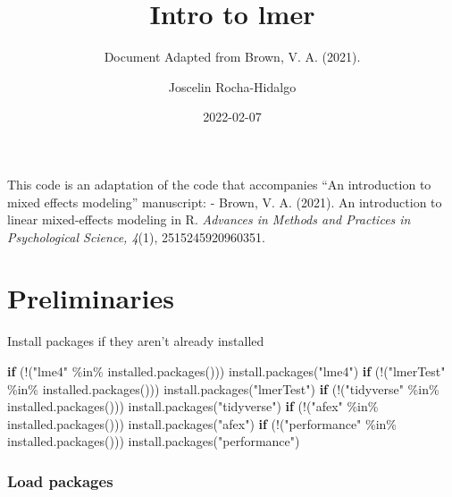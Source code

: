 \documentclass[
]{article}
\title{Intro to lmer}
\subtitle{Document Adapted from Brown, V. A. (2021).}
\author{Joscelin Rocha-Hidalgo}
\date{2022-02-07}
\newenvironment{Shaded}{\begin{snugshade}}{\end{snugshade}}
\newcommand{\ControlFlowTok}[1]{\textcolor[rgb]{0.13,0.29,0.53}{\textbf{#1}}}
\newcommand{\FunctionTok}[1]{\textcolor[rgb]{0.00,0.00,0.00}{#1}}
\newcommand{\NormalTok}[1]{#1}
\newcommand{\SpecialCharTok}[1]{\textcolor[rgb]{0.00,0.00,0.00}{#1}}
\newcommand{\StringTok}[1]{\textcolor[rgb]{0.31,0.60,0.02}{#1}}
\begin{document}
\maketitle

{
\setcounter{tocdepth}{6}
\tableofcontents
}
This code is an adaptation of the code that accompanies ``An
introduction to mixed effects modeling'' manuscript: - Brown, V. A.
(2021). An introduction to linear mixed-effects modeling in R.
\emph{Advances in Methods and Practices in Psychological Science, 4}(1),
2515245920960351.

\hypertarget{preliminaries}{%
\section{Preliminaries}\label{preliminaries}}

Install packages if they aren't already installed

\begin{Shaded}
\begin{Highlighting}[]
\ControlFlowTok{if}\NormalTok{ (}\SpecialCharTok{!}\NormalTok{(}\StringTok{"lme4"} \SpecialCharTok{\%in\%} \FunctionTok{installed.packages}\NormalTok{())) }\FunctionTok{install.packages}\NormalTok{(}\StringTok{"lme4"}\NormalTok{)}
\ControlFlowTok{if}\NormalTok{ (}\SpecialCharTok{!}\NormalTok{(}\StringTok{"lmerTest"} \SpecialCharTok{\%in\%} \FunctionTok{installed.packages}\NormalTok{())) }\FunctionTok{install.packages}\NormalTok{(}\StringTok{"lmerTest"}\NormalTok{)}
\ControlFlowTok{if}\NormalTok{ (}\SpecialCharTok{!}\NormalTok{(}\StringTok{"tidyverse"} \SpecialCharTok{\%in\%} \FunctionTok{installed.packages}\NormalTok{())) }\FunctionTok{install.packages}\NormalTok{(}\StringTok{"tidyverse"}\NormalTok{)}
\ControlFlowTok{if}\NormalTok{ (}\SpecialCharTok{!}\NormalTok{(}\StringTok{"afex"} \SpecialCharTok{\%in\%} \FunctionTok{installed.packages}\NormalTok{())) }\FunctionTok{install.packages}\NormalTok{(}\StringTok{"afex"}\NormalTok{)}
\ControlFlowTok{if}\NormalTok{ (}\SpecialCharTok{!}\NormalTok{(}\StringTok{"performance"} \SpecialCharTok{\%in\%} \FunctionTok{installed.packages}\NormalTok{())) }\FunctionTok{install.packages}\NormalTok{(}\StringTok{"performance"}\NormalTok{)}
\end{Highlighting}
\end{Shaded}

\hypertarget{load-packages}{%
\subsubsection{Load packages}\label{load-packages}}
\end{document}
